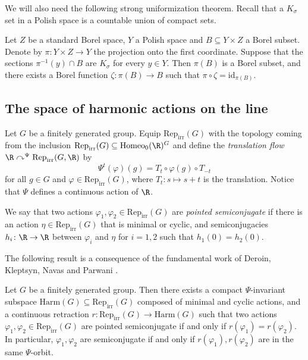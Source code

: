 \documentclass[reqno]{amsart}
\begin{document}
We will also need the following strong uniformization theorem. Recall that a $K_\sigma$ set in a Polish space is a countable union of compact sets.

\begin{teo} \label{teo:ksigma}
Let $Z$ be a standard Borel space, $Y$ a Polish space and $B \subseteq Y \times Z$ a Borel subset. Denote by $\pi \colon Y \times Z \to Y$ the projection onto the first coordinate. Suppose that the sections $\pi^{-1}(y) \cap B$ are $K_\sigma$ for every $y \in Y$. Then $\pi(B)$ is a Borel subset, and there exists a Borel function $\zeta \colon \pi(B) \to B$ such that $\pi \circ \zeta = \mathrm{id}_{\pi(B)}$.
\end{teo}

\subsection{The space of harmonic actions on the line} \label{sec:harmonic}
Let $G$ be a finitely generated group. Equip $\mathrm{Rep}_\mathrm{irr}(G)$ with the topology coming from the inclusion $\mathrm{Rep}_\mathrm{irr}(G) \subseteq \mathrm{Homeo}_0(\R)^G$ and define the \emph{translation flow} $\R \curvearrowright^\Psi \mathrm{Rep}_\mathrm{irr}(G,\R)$ by
\[
        \Psi^t(\varphi)(g) = T_{t} \circ \varphi(g)\circ T_{-t}%
\]
for all $g \in G$ and $\varphi \in \mathrm{Rep}_\mathrm{irr}(G)$, where $T_t\colon s\mapsto s+t$ is the translation. Notice that $\Psi$ defines a continuous action of $\R$.

We say that two actions $\varphi_1, \varphi_2 \in \mathrm{Rep}_\mathrm{irr}(G)$ are \emph{pointed semiconjugate} if there is an action $\eta \in \mathrm{Rep}_\mathrm{irr}(G)$ that is minimal or cyclic, and semiconjugacies $h_i \colon \R \to \R$ between $\varphi_i$ and $\eta$ for $i = 1,2$ such that $h_1(0) = h_2(0)$.

The following result is a consequence of the fundamental work of Deroin, Kleptsyn, Navas and Parwani \cite{DKNP}.
\begin{teo} \label{teo:existenciaDeroin}
        Let $G$ be a finitely generated group. Then there exists a compact $\Psi$-invariant subspace $\mathrm{Harm}(G) \subseteq \mathrm{Rep}_\mathrm{irr}(G)$ composed of minimal and cyclic actions, and a continuous retraction $r \colon \mathrm{Rep}_\mathrm{irr}(G) \to \mathrm{Harm}(G)$ such that two actions $\varphi_1, \varphi_2 \in \mathrm{Rep}_\mathrm{irr}(G)$ are pointed semiconjugate if and only if $r(\varphi_1) = r(\varphi_2)$. In particular, $\varphi_1, \varphi_2$ are semiconjugate if and only if $r(\varphi_1), r(\varphi_2)$ are in the same $\Psi$-orbit.
\end{teo}
\end{document}
